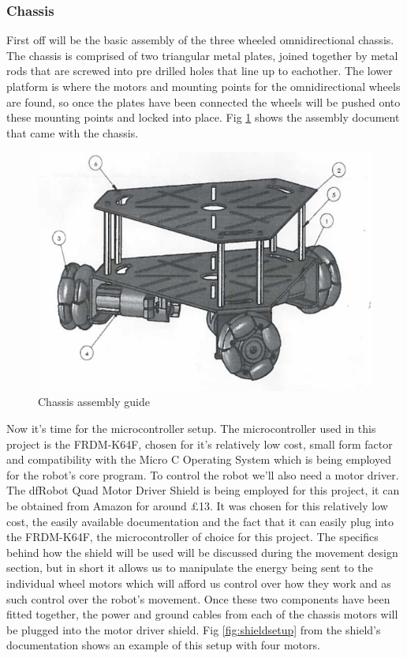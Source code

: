 				\subsubsection{Chassis}
				First off will be the basic assembly of the three wheeled omnidirectional chassis. The chassis is comprised of two triangular metal plates, joined together by metal rods that are screwed into pre drilled holes that line up to eachother. The lower platform is where the motors and mounting points for the omnidirectional wheels are found, so once the plates have been connected the wheels will be pushed onto these mounting points and locked into place. Fig \ref{fig:chassisassembly} shows the assembly document that came with the chassis.
				\begin{figure}[h]
					\centering
					\includegraphics[width=.9\linewidth]{SYNTHESIS/chassisassembly.png}
					\caption{Chassis assembly guide}
					\label{fig:chassisassembly}
				\end{figure}
				
				Now it's time for the microcontroller setup. The microcontroller used in this project is the FRDM-K64F, chosen for it's relatively low cost, small form factor and compatibility with the Micro C Operating System which is being employed for the robot's core program. To control the robot we'll also need a motor driver. The dfRobot Quad Motor Driver Shield is being employed for this project, it can be obtained from Amazon for around \pounds{13}. It was chosen for this relatively low cost, the easily available documentation and the fact that it can easily plug into the FRDM-K64F, the microcontroller of choice for this project. The specifics behind how the shield will be used will be discussed during the movement design section, but in short it allows us to manipulate the energy being sent to the individual wheel motors which will afford us control over how they work and as such control over the robot's movement. Once these two components have been fitted together, the power and ground cables from each of the chassis motors will be plugged into the motor driver shield. Fig \ref{fig:shieldsetup} from the shield's documentation shows an example of this setup with four motors.
				

